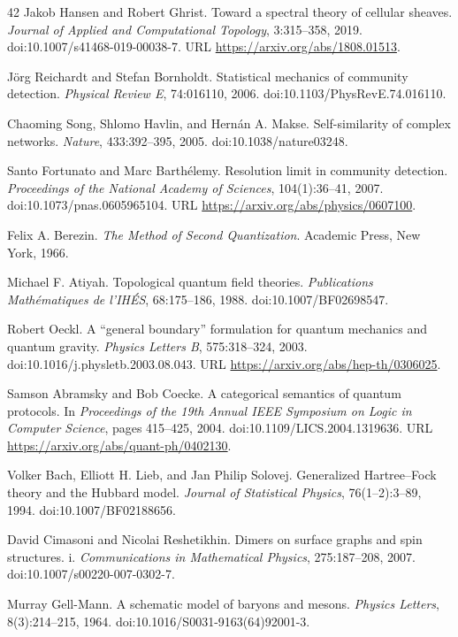 \documentclass[11pt,letterpaper]{article}
\begin{document}
\begin{thebibliography}{42}
Jakob Hansen and Robert Ghrist.
Toward a spectral theory of cellular sheaves.
\emph{Journal of Applied and Computational Topology}, 3:315--358, 2019.
doi:10.1007/s41468-019-00038-7.
URL \url{https://arxiv.org/abs/1808.01513}.

J\"org Reichardt and Stefan Bornholdt.
Statistical mechanics of community detection.
\emph{Physical Review E}, 74:016110, 2006.
doi:10.1103/PhysRevE.74.016110.

Chaoming Song, Shlomo Havlin, and Hern\'an A. Makse.
Self-similarity of complex networks.
\emph{Nature}, 433:392--395, 2005.
doi:10.1038/nature03248.

Santo Fortunato and Marc Barth\'elemy.
Resolution limit in community detection.
\emph{Proceedings of the National Academy of Sciences}, 104(1):36--41, 2007.
doi:10.1073/pnas.0605965104.
URL \url{https://arxiv.org/abs/physics/0607100}.

Felix A. Berezin.
\emph{The Method of Second Quantization}.
Academic Press, New York, 1966.

Michael F. Atiyah.
Topological quantum field theories.
\emph{Publications Math\'ematiques de l'IH\'ES}, 68:175--186, 1988.
doi:10.1007/BF02698547.

Robert Oeckl.
A ``general boundary'' formulation for quantum mechanics and quantum gravity.
\emph{Physics Letters B}, 575:318--324, 2003.
doi:10.1016/j.physletb.2003.08.043.
URL \url{https://arxiv.org/abs/hep-th/0306025}.

Samson Abramsky and Bob Coecke.
A categorical semantics of quantum protocols.
In \emph{Proceedings of the 19th Annual IEEE Symposium on Logic in Computer
Science}, pages 415--425, 2004.
doi:10.1109/LICS.2004.1319636.
URL \url{https://arxiv.org/abs/quant-ph/0402130}.

Volker Bach, Elliott H. Lieb, and Jan Philip Solovej.
Generalized Hartree--Fock theory and the Hubbard model.
\emph{Journal of Statistical Physics}, 76(1--2):3--89, 1994.
doi:10.1007/BF02188656.

David Cimasoni and Nicolai Reshetikhin.
Dimers on surface graphs and spin structures. i.
\emph{Communications in Mathematical Physics}, 275:187--208, 2007.
doi:10.1007/s00220-007-0302-7.

Murray Gell-Mann.
A schematic model of baryons and mesons.
\emph{Physics Letters}, 8(3):214--215, 1964.
doi:10.1016/S0031-9163(64)92001-3.


\end{thebibliography}
\end{document}
